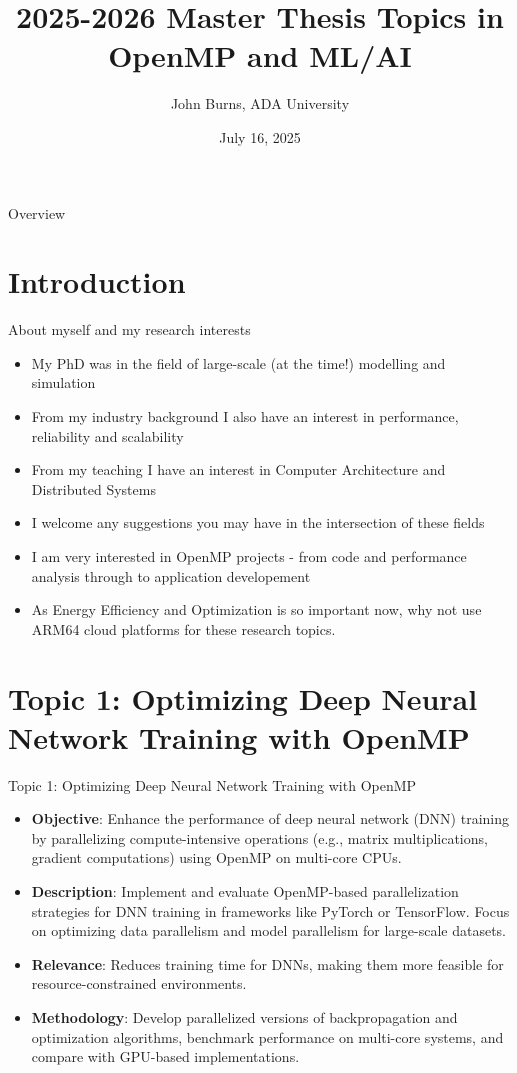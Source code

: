 \documentclass{beamer}
\title{2025-2026 Master Thesis Topics in OpenMP and ML/AI}
\author{John Burns, ADA University}
\date{July 16, 2025}
\begin{document}
\begin{frame}
    \titlepage
\end{frame}

\begin{frame}{Overview}
    \tableofcontents
\end{frame}

\section{Introduction}
\begin{frame}{About myself and my research interests}
    \begin{itemize}
	\item My PhD was in the field of large-scale (at the time!) modelling and simulation
        \item From my industry background I also have an interest in performance, reliability and scalability
        \item From my teaching I have an interest in Computer Architecture and Distributed Systems
        \item I welcome any suggestions you may have in the intersection of these fields
        \item I am very interested in OpenMP projects - from code and performance analysis through to application developement
	\item As Energy Efficiency and Optimization is so important now, why not use ARM64 cloud platforms for these research topics.
    \end{itemize}
\end{frame}

\section{Topic 1: Optimizing Deep Neural Network Training with OpenMP}
\begin{frame}{Topic 1: Optimizing Deep Neural Network Training with OpenMP}
\begin{itemize}
    \item \textbf{Objective}: Enhance the performance of deep neural network (DNN) training by parallelizing compute-intensive operations (e.g., matrix multiplications, gradient computations) using OpenMP on multi-core CPUs.
    \item \textbf{Description}: Implement and evaluate OpenMP-based parallelization strategies for DNN training in frameworks like PyTorch or TensorFlow. Focus on optimizing data parallelism and model parallelism for large-scale datasets.
    \item \textbf{Relevance}: Reduces training time for DNNs, making them more feasible for resource-constrained environments.
    \item \textbf{Methodology}: Develop parallelized versions of backpropagation and optimization algorithms, benchmark performance on multi-core systems, and compare with GPU-based implementations.
\end{itemize}
\end{frame}
\end{document}
